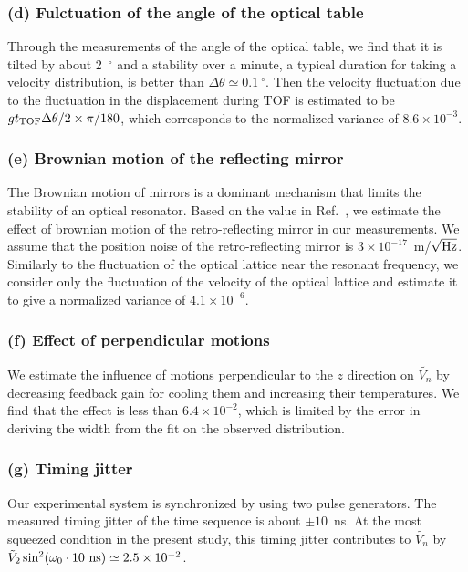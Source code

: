 \documentclass[aps, prl, 
amsmath, showpacs, preprintnumbers, twocolumn, amssymb, amsmath, superscriptaddress]{revtex4-1}
\begin{document}
\subsubsection*{(d) Fulctuation of the angle of the optical table}
Through the measurements of the angle of the optical table, we find that it is tilted by about 2~$^\circ$ and a stability over a minute, a typical duration for taking a velocity distribution, is better than $\Delta \theta \simeq 0.1~^\circ $. Then the velocity fluctuation due to the fluctuation in the displacement during TOF is estimated to be $g t_{\rm TOF} \Delta \theta/2 \times \pi/180$, which corresponds to the normalized variance of $8.6 \times 10^{-3}$.

\subsubsection*{(e) Brownian motion of the reflecting mirror}
The Brownian motion of mirrors is a dominant mechanism that limits the stability of an optical resonator. Based on the value in Ref.~\cite{numata2004thermal}, we estimate the effect of brownian motion of the retro-reflecting mirror in our measurements. We assume that the position noise of the retro-reflecting mirror is $3 \times 10^{-17}$~m/$\sqrt{\rm Hz} $. Similarly to the fluctuation of the optical lattice near the resonant frequency, we consider only the fluctuation of the velocity of the optical lattice and estimate it to give a normalized variance of $4.1 \times 10^{-6}$.

\subsubsection*{(f) Effect of perpendicular motions}
We estimate the influence of motions perpendicular to the $z$ direction on $\tilde{V_n}$ by decreasing feedback gain for cooling them and increasing their temperatures. We find that the effect is less than $6.4 \times 10^{-2}$, which is limited by the error in deriving the width from the fit on the observed distribution. 

\subsubsection*{(g) Timing jitter}
Our experimental system is synchronized by using two pulse generators. The measured timing jitter of the time sequence is about $\pm 10$~ns. At the most squeezed condition in the present study, this timing jitter contributes to $\tilde{V_n}$ by $\tilde{V}_2 \sin^2 (\omega_0 \cdot 10~{\rm ns}) \simeq 2.5 \times 10^{-2}$.
\end{document}
